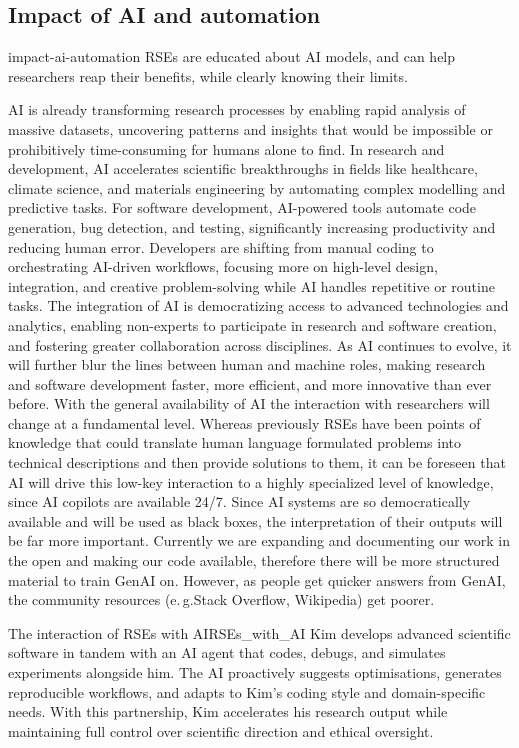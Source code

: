 \documentclass{eceasst}
\newcommand{\eg}{e.\,g.}
\begin{document}
\subsection{Impact of AI and automation}
\begin{whatis}{}{impact-ai-automation}
RSEs are educated about AI models, and can help researchers reap their benefits, while
clearly knowing their limits.
\end{whatis}
AI is already transforming research processes by enabling rapid analysis of massive datasets, uncovering patterns and insights that would be impossible or prohibitively time-consuming for humans alone to find.
In research and development, AI accelerates scientific breakthroughs in fields like healthcare, climate science, and materials engineering by automating complex modelling and predictive tasks.
For software development, AI-powered tools automate code generation, bug detection, and testing, significantly increasing productivity and reducing human error.
Developers are shifting from manual coding to orchestrating AI-driven workflows, focusing more on high-level design, integration, and creative problem-solving while AI handles repetitive or routine tasks.
The integration of AI is democratizing access to advanced technologies and analytics, enabling non-experts to participate in research and software creation, and fostering greater collaboration across disciplines.
As AI continues to evolve, it will further blur the lines between human and machine roles, making research and software development faster, more efficient, and more innovative than ever before.
With the general availability of AI the interaction with researchers will change at a fundamental level.
Whereas previously RSEs have been points of knowledge that could translate human language formulated problems into technical descriptions and then provide solutions to them,
it can be foreseen that AI will drive this low-key interaction to a highly specialized level of knowledge,
since AI copilots are available 24/7.
Since AI systems are so democratically available and will be used as black boxes,
the interpretation of their outputs will be far more important.
Currently we are expanding and documenting our work in the open and making our code available,
therefore there will be more structured material to train GenAI on.
However, as people get quicker answers from GenAI, the community resources (\eg Stack Overflow, Wikipedia)
get poorer.

\begin{story}{The interaction of RSEs with AI}{RSEs_with_AI}
Kim develops advanced scientific software in tandem with an AI agent that codes, debugs, and simulates experiments alongside him. The AI proactively suggests optimisations, generates reproducible workflows, and adapts to Kim’s coding style and domain-specific needs. With this partnership, Kim accelerates his research output while maintaining full control over scientific direction and ethical oversight.
\end{story}
\end{document}

